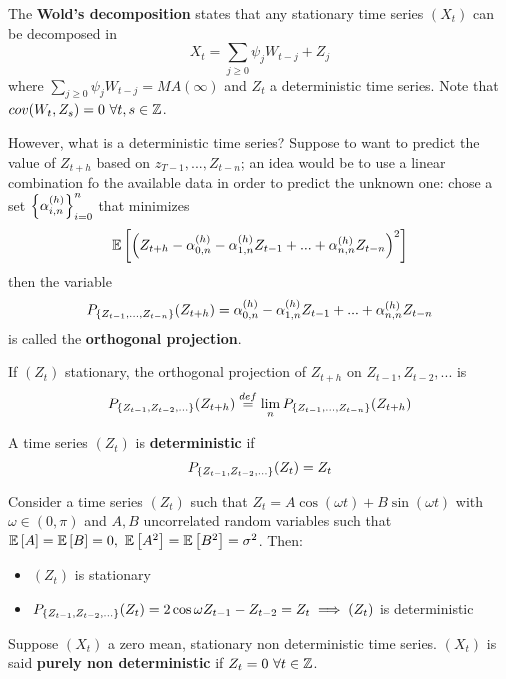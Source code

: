 \begin{definition}
    The \textbf{Wold's decomposition} states that any stationary time series $(X_t)$ can be decomposed in
    \[
        X_t=\sum_{j\ge0}\psi_jW_{t-j}+Z_j  
    \]
    where $\sum_{j\ge0}\psi_jW_{t-j}=MA(\infty)$ and $Z_t$ a deterministic time series. Note that $cov(W_t,Z_s)=0\ \forall t,s\in\mathbb{Z}$.
\end{definition}

However, what is a deterministic time series? Suppose to want to predict the value of $Z_{t+h}$ based on $z_{T-1},...,Z_{t-n}$; an idea would be to use a linear combination fo the available data in order to predict the unknown one: chose a set $\left\{\alpha_{i,n}^{(h)}\right\}_{i=0}^n$ that minimizes
\[
    \mathbb{E}\left[\left(Z_{t+h}-\alpha_{0,n}^{(h)}-\alpha_{1,n}^{(h)}Z_{t-1}+...+\alpha_{n,n}^{(h)}Z_{t-n}\right)^2\right]  
\]
then the variable
\[
    P_{\left\{Z_{t-1},...,Z_{t-n}\right\}}(Z_{t+h})=\alpha_{0,n}^{(h)}-\alpha_{1,n}^{(h)}Z_{t-1}+...+\alpha_{n,n}^{(h)}Z_{t-n}
\]
is called the \textbf{orthogonal projection}.

\begin{definition}
    If $(Z_t)$ stationary, the orthogonal projection of $Z_{t+h}$ on $Z_{t-1},Z_{t-2},...$ is
    \[
        P_{\left\{Z_{t-1},Z_{t-2},...\right\}}(Z_{t+h})\stackrel{def}{=}\lim_{n}P_{\left\{Z_{t-1},...,Z_{t-n}\right\}}(Z_{t+h})
    \]
\end{definition}

\begin{definition}
    A time series $(Z_t)$ is \textbf{deterministic} if
    \[
        P_{\left\{Z_{t-1},Z_{t-2},...\right\}}(Z_{t})=Z_t
    \]
\end{definition}

\begin{example}
    Consider a time series $(Z_t)$ such that $Z_t=A\cos(\omega t)+B\sin(\omega t)$ with $\omega\in(0,\pi)$ and $A,B$ uncorrelated random variables such that $\expect{A}=\expect{B}=0,\ \expect{A^2}=\expect{B^2}=\sigma^2$. Then:
    \begin{itemize}
        \item $(Z_t)$ is stationary
        \item $P_{\left\{Z_{t-1},Z_{t-2},...\right\}}(Z_{t})=2\cos\omega Z_{t-1}-Z_{t-2}=Z_t\implies(Z_t)$ is deterministic
    \end{itemize}
\end{example}

\begin{definition}
    Suppose $(X_t)$ a zero mean, stationary non deterministic time series. $(X_t)$ is said \textbf{purely non deterministic} if $Z_t=0\ \forall t\in\mathbb{Z}$.
\end{definition}

